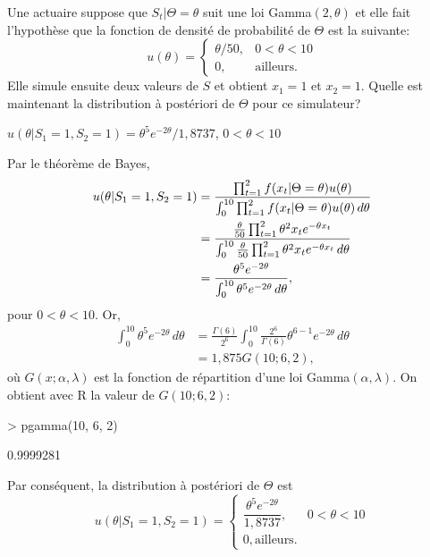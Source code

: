 \begin{exercice}
  Une actuaire suppose que $S_t|\Theta = \theta$ suit une loi
  Gamma$(2, \theta)$ et elle fait l'hypothèse que la fonction de
  densité de probabilité de $\Theta$ est la suivante:
  \begin{equation*}
    u(\theta) =
    \begin{cases}
      \theta /50, & 0< \theta < 10 \\
      0, & \text{ailleurs}.
    \end{cases}
  \end{equation*}
  Elle simule ensuite deux valeurs de $S$ et obtient $x_1 = 1$ et
  $x_2 = 1$. Quelle est maintenant la distribution à postériori de
  $\Theta$ pour ce simulateur?
  \begin{rep}
    $u(\theta|S_1 = 1, S_2 = 1) = \theta^{5} e^{-2\theta}/1,8737$,
    $0 < \theta < 10$
  \end{rep}
  \begin{sol}
    Par le théorème de Bayes,
    \begin{align*}
      u(\theta|S_1 = 1, S_2 = 1)
      &= \frac{\prod_{t = 1}^2 f(x_t|\Theta = \theta)u(\theta)}{%
        \int_0^{10} \prod_{t = 1}^2 f(x_t|\Theta = \theta)u(\theta)\, d\theta} \\
      &= \frac{\frac{\theta}{50} \prod_{t = 1}^2 \theta^2 x_t e^{-\theta x_t}}{%
        \int_0^{10} \frac{\theta}{50}
        \prod_{t = 1}^2 \theta^2 x_t e^{-\theta x_t}\, d\theta} \\
      &= \frac{\theta^5 e^{-2\theta}}{\int_0^{10} \theta^5 e^{-2\theta}\, d\theta},
    \end{align*}
    pour $0 < \theta < 10$. Or,
    \begin{align*}
      \int_0^{10} \theta^5 e^{-2\theta}\, d\theta
      &= \frac{\Gamma(6)}{2^6}
      \int_0^{10} \frac{2^6}{\Gamma(6)} \theta^{6-1} e^{-2\theta}\, d\theta \\
      &= 1,875 G(10; 6, 2),
    \end{align*}
    où $G(x; \alpha, \lambda)$ est la fonction de répartition d'une
    loi Gamma$(\alpha, \lambda)$. On obtient avec R la valeur de
    $G(10; 6, 2)$:
\begin{Schunk}
\begin{Sinput}
> pgamma(10, 6, 2)
\end{Sinput}
\begin{Soutput}
[1] 0.9999281
\end{Soutput}
\end{Schunk}
    Par conséquent, la distribution à postériori de $\Theta$ est
    \begin{equation*}
      u(\theta|S_1 = 1, S_2 = 1) =
      \begin{cases}
        \dfrac{\theta^5 e^{-2\theta}}{1,8737}, & 0 < \theta < 10 \\
        0, \text{ailleurs}.
      \end{cases}
    \end{equation*}
  \end{sol}
\end{exercice}

